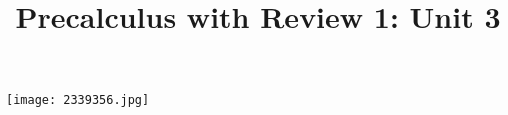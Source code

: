 \documentclass[handout]{xourse}
\title{Precalculus with Review 1: Unit 3}
\begin{document}
\texttt{[image: 2339356.jpg]}
\maketitle


	





%
%
%
%
%
%
%
%
%
%
%
%
%
%
%
%
%
\end{document}
